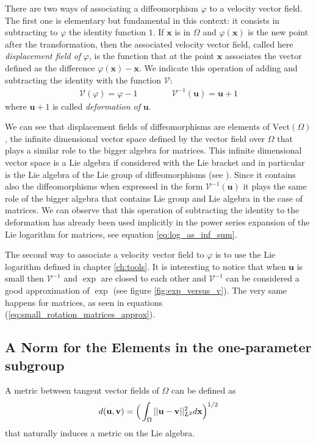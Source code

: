 There are two ways of associating a diffeomorphism $\varphi$ to a velocity vector field. The first one is elementary but fundamental in this context: it consists in subtracting to $\varphi$ the identity function $1$. If $\mathbf{x}$ is in $\Omega$ and $\varphi(\mathbf{x})$ is the new point after the transformation, then the associated velocity vector field, called here \emph{displacement field of} $\varphi$, is the function that at the point $\mathbf{x}$ associates the vector defined as the difference $\varphi(\mathbf{x}) - \mathbf{x}$. We indicate this operation of adding and subtracting the identity with the function $\mathcal{V}$:
\begin{align*}
\mathcal{V}(\varphi) = \varphi - 1 
\qquad \qquad
\mathcal{V}^{-1}(\mathbf{u}) = \mathbf{u} + 1 
\end{align*}
where $\mathbf{u} + 1 $ is called \emph{deformation of} $\mathbf{u}$.

We can see that displacement fields of diffeomorphisms are elements of $\text{Vect}(\Omega)$, the infinite dimensional vector space defined by the vector field over $\Omega$ that plays a similar role to the bigger algebra for matrices. This infinite dimensional vector space is a Lie algebra if considered with the Lie bracket and in particular is the Lie algebra of the Lie group of diffeomorphisms (see \cite{khesin2008geometry}). Since it contains also the diffeomorphisms when expressed in the form $\mathcal{V}^{-1}(\mathbf{u}) $ it plays the same role of the bigger algebra that contains Lie group and Lie algebra in the case of matrices. We can observe that this operation of subtracting the identity to the deformation has already been used implicitly in the power series expansion of the Lie logarithm for matrices, see equation \ref{eq:log_as_inf_sum}.

The second way to associate a velocity vector field to $\varphi$ is to use the Lie logarithm defined in chapter \ref{ch:tools}. It is interesting to notice that when $\mathbf{u}$ is small then $\mathcal{V}^{-1}$ and $\exp$ are closed to each other and $\mathcal{V}^{-1}$ can be considered a good approximation of $\exp$ (see figure \ref{fig:exp_versus_v}). The very same happens for matrices, as seen in equations (\ref{eq:small_rotation_matrices_approx}). 


\subsection{A Norm for the Elements in the one-parameter subgroup}\label{subse:norm}
A metric between tangent vector fields of $\Omega$ can be defined as 
\begin{align}\label{def:metric_two_svf}
d(\mathbf{u}, \mathbf{v}) 
= 
\Big( \int_{\Omega} \vert\lvert \mathbf{u} - \mathbf{v} \rvert\vert_{L^2}^{2} d\mathbf{x} \Big)^{1/2}
\end{align} 
that naturally induces a metric on the Lie algebra.

